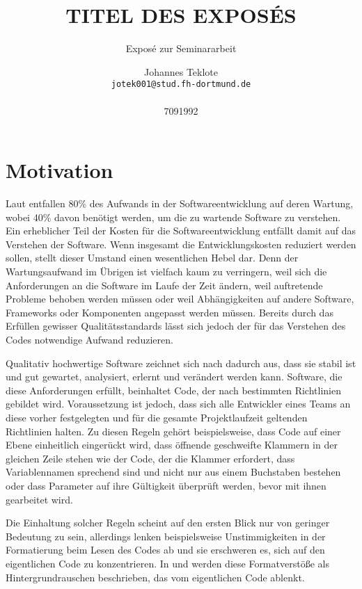 \documentclass[fontsize=11pt, paper=a4, parskip=half]{scrartcl}
\title{
	TITEL DES EXPOSÉS
}
\subtitle{Exposé zur Seminararbeit}
\author{
	Johannes Teklote
	\\
	\texttt{jotek001@stud.fh-dortmund.de}
	\\ \\
	{7091992}
}
\begin{document}
\maketitle

\section{Motivation}
Laut \cite{Balzert2009} entfallen 80\% des Aufwands in der Softwareentwicklung auf deren Wartung, wobei 40\% davon benötigt werden, um die zu wartende Software zu verstehen.
Ein erheblicher Teil der Kosten für die Softwareentwicklung entfällt damit auf das Verstehen der Software.
Wenn insgesamt die Entwicklungskosten reduziert werden sollen, stellt dieser Umstand einen wesentlichen Hebel dar.
Denn der Wartungsaufwand im Übrigen ist vielfach kaum zu verringern, weil sich die Anforderungen an die Software im Laufe der Zeit ändern, weil auftretende Probleme behoben werden müssen oder weil Abhängigkeiten auf andere Software, Frameworks oder Komponenten angepasst werden müssen.
Bereits durch das Erfüllen gewisser Qualitätsstandards lässt sich jedoch der für das Verstehen des Codes notwendige Aufwand reduzieren.

Qualitativ hochwertige Software zeichnet sich nach \cite{ISO-25010} dadurch aus, dass sie stabil ist und gut gewartet, analysiert, erlernt und verändert werden kann.
Software, die diese Anforderungen erfüllt, beinhaltet Code, der nach bestimmten Richtlinien gebildet wird.
Voraussetzung ist jedoch, dass sich alle Entwickler eines Teams an diese vorher festgelegten und für die gesamte Projektlaufzeit geltenden Richtlinien halten.
Zu diesen Regeln gehört beispielsweise, dass Code auf einer Ebene einheitlich eingerückt wird, dass öffnende geschweifte Klammern in der gleichen Zeile stehen wie der Code, der die Klammer erfordert, dass Variablennamen sprechend sind und nicht nur aus einem Buchstaben bestehen oder dass Parameter auf ihre Gültigkeit überprüft werden, bevor mit ihnen gearbeitet wird.

Die Einhaltung solcher Regeln scheint auf den ersten Blick nur von geringer Bedeutung zu sein, allerdings lenken beispielsweise Unstimmigkeiten in der Formatierung beim Lesen des Codes ab und sie erschweren es, sich auf den eigentlichen Code zu konzentrieren.
In \cite{PJ2015} und \cite{SP2011} werden diese Formatverstöße als Hintergrundrauschen beschrieben, das vom eigentlichen Code ablenkt. 
\end{document}
